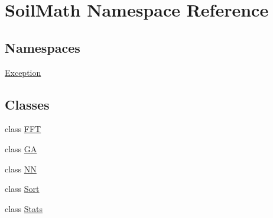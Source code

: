 \hypertarget{namespace_soil_math}{}\section{Soil\+Math Namespace Reference}
\label{namespace_soil_math}
\subsection*{Namespaces}
\begin{DoxyCompactItemize}
\item 
 \hyperlink{namespace_soil_math_1_1_exception}{Exception}
\end{DoxyCompactItemize}
\subsection*{Classes}
\begin{DoxyCompactItemize}
\item 
class \hyperlink{class_soil_math_1_1_f_f_t}{F\+F\+T}
\item 
class \hyperlink{class_soil_math_1_1_g_a}{G\+A}
\item 
class \hyperlink{class_soil_math_1_1_n_n}{N\+N}
\item 
class \hyperlink{class_soil_math_1_1_sort}{Sort}
\item 
class \hyperlink{class_soil_math_1_1_stats}{Stats}
\end{DoxyCompactItemize}
